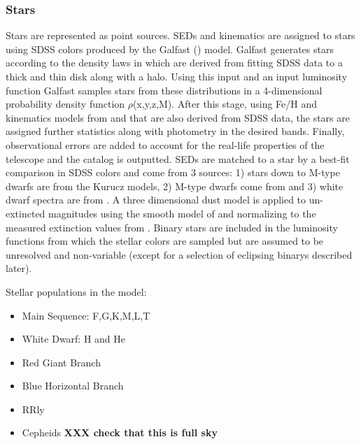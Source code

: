 \documentclass[]{article}
\begin{document}
\subsubsection{Stars}
Stars are represented as point sources.  SEDs and kinematics are assigned to stars using SDSS colors produced by the Galfast (\cite{galfast})
model.  Galfast generates stars according to the density laws in \cite{juric} which are derived from fitting SDSS data to a thick and thin disk along with a halo. Using this input and an input luminosity function Galfast samples stars from these distributions in a 4-dimensional probability density function $\rho$(x,y,z,M). After this stage, using Fe/H and kinematics models from \cite{ivezic} and \cite{bond} that are also derived from SDSS data, the stars are assigned further statistics along
with photometry in the desired bands. Finally, observational errors are added to account for the real-life properties of the telescope and the catalog is outputted. SEDs are matched to a star by a best-fit comparison in SDSS colors and come from 3 sources: 1) stars down to M-type dwarfs are from the Kurucz models, 2) M-type dwarfs come from \cite{bochanski} and 3) white dwarf spectra are from \cite{bergeron}. A three dimensional dust model is applied to un-extincted magnitudes using the smooth
model of \cite{amores} and normalizing to the
measured extinction values from \cite{sfd}.  Binary stars are included in the luminosity functions from which the stellar colors are sampled but are assumed to be unresolved and non-variable (except for a selection of eclipsing binarys described later).

Stellar  populations in the model:
\begin{itemize}
\item Main Sequence: F,G,K,M,L,T
\item White Dwarf: H and He
\item Red Giant Branch
\item Blue Horizontal Branch
\item RRly
\item Cepheids {\bf XXX check that this is full sky}
\end{itemize}
\end{document}

